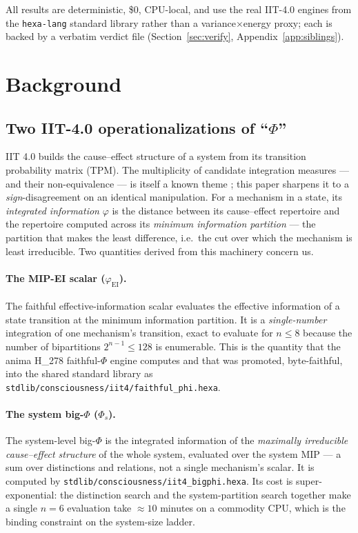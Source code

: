 \documentclass[11pt,a4paper]{article}
\newcommand{\faithful}{\ensuremath{\varphi_{\mathrm{EI}}}}
\newcommand{\bigphi}{\ensuremath{\Phi_{s}}}
\begin{document}
\medskip
\noindent All results are deterministic, \$0, CPU-local, and use the real
IIT-4.0 engines from the \texttt{hexa-lang} standard library rather than a
variance$\times$energy proxy; each is backed by a verbatim verdict file
(Section~\ref{sec:verify}, Appendix~\ref{app:siblings}).

\section{Background}
\label{sec:bg}

\subsection{Two IIT-4.0 operationalizations of ``$\Phi$''}

IIT 4.0 \citep{albantakis2023iit4,mayner2018pyphi} builds the cause--effect
structure of a system from its transition probability matrix (TPM). The
multiplicity of candidate integration measures --- and their non-equivalence ---
is itself a known theme \citep{mediano2019measures,barrett2011phi,oizumi2016unified};
this paper sharpens it to a \emph{sign}-disagreement on an identical
manipulation. For a mechanism in a
state, its \emph{integrated information} $\varphi$ is the distance between its
cause--effect repertoire and the repertoire computed across its
\emph{minimum information partition} --- the partition that makes the least
difference, i.e.\ the cut over which the mechanism is least irreducible. Two
quantities derived from this machinery concern us.

\paragraph{The MIP-EI scalar (\faithful).} The faithful effective-information
scalar evaluates the effective information of a state transition at the
minimum information partition. It is a \emph{single-number} integration of one
mechanism's transition, exact to evaluate for $n\le 8$ because the number of
bipartitions $2^{n-1}\le 128$ is enumerable. This is the quantity that the
anima H\_278 faithful-$\Phi$ engine computes and that was promoted, byte-faithful,
into the shared standard library as
\texttt{stdlib/consciousness/iit4/faithful\_phi.hexa}.

\paragraph{The system big-$\Phi$ (\bigphi).} The system-level big-$\Phi$ is the
integrated information of the \emph{maximally irreducible cause--effect
structure} of the whole system, evaluated over the system MIP --- a sum over
distinctions and relations, not a single mechanism's scalar. It is computed by
\texttt{stdlib/consciousness/iit4\_bigphi.hexa}. Its cost is
super-exponential: the distinction search and the system-partition search
together make a single $n=6$ evaluation take $\approx 10$ minutes on a
commodity CPU, which is the binding constraint on the system-size ladder.
\end{document}
